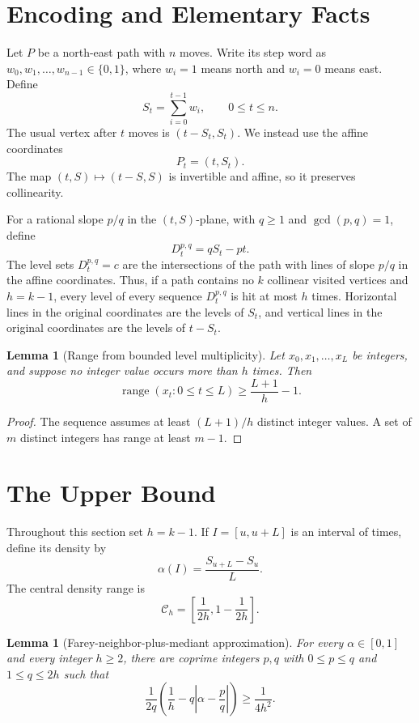 \documentclass[10pt,a4paper]{amsart}
\newtheorem{lemma}[theorem]{Lemma}
\newcommand{\range}{\operatorname{range}}
\newcommand{\1}{\mathbf 1}
\begin{document}
\section{Encoding and Elementary Facts}\label{sec:encoding}

Let $P$ be a north-east path with $n$ moves. Write its step word as $w_0,w_1,\ldots,w_{n-1}\in\{0,1\}$, where $w_i=1$ means north and $w_i=0$ means east. Define
\[
S_t=\sum_{i=0}^{t-1}w_i,\qquad 0\le t\le n.
\]
The usual vertex after $t$ moves is $(t-S_t,S_t)$. We instead use the affine coordinates
\[
P_t=(t,S_t).
\]
The map $(t,S)\mapsto(t-S,S)$ is invertible and affine, so it preserves collinearity.

\bigskip
\noindent
For a rational slope $p/q$ in the $(t,S)$-plane, with $q\ge1$ and $\gcd(p,q)=1$, define
\[
D_t^{p,q}=qS_t-pt.
\]
The level sets $D_t^{p,q}=c$ are the intersections of the path with lines of slope $p/q$ in the affine coordinates. Thus, if a path contains no $k$ collinear visited vertices and $h=k-1$, every level of every sequence $D_t^{p,q}$ is hit at most $h$ times. Horizontal lines in the original coordinates are the levels of $S_t$, and vertical lines in the original coordinates are the levels of $t-S_t$.

\begin{lemma}[Range from bounded level multiplicity]\label{lem:range}
Let $x_0,x_1,\ldots,x_L$ be integers, and suppose no integer value occurs more than $h$ times. Then
\[
\range(x_t:0\le t\le L)\ge \frac{L+1}{h}-1.
\]
\end{lemma}

\begin{proof}
The sequence assumes at least $(L+1)/h$ distinct integer values. A set of $m$ distinct integers has range at least $m-1$.
\end{proof}

\section{The Upper Bound}\label{sec:upper}

Throughout this section set $h=k-1$. If $I=[u,u+L]$ is an interval of times, define its density by
\[
\alpha(I)=\frac{S_{u+L}-S_u}{L}.
\]
The central density range is
\[
\mathcal C_h=\left[\frac1{2h},1-\frac1{2h}\right].
\]

\begin{lemma}[Farey-neighbor-plus-mediant approximation]\label{lem:farey_mediant}
For every $\alpha\in[0,1]$ and every integer $h\ge2$, there are coprime integers $p,q$ with $0\le p\le q$ and $1\le q\le2h$ such that
\[
\frac1{2q}\left(\frac1h-q\left|\alpha-\frac pq\right|\right)
\ge \frac1{4h^2}.
\]
\end{lemma}
\end{document}
